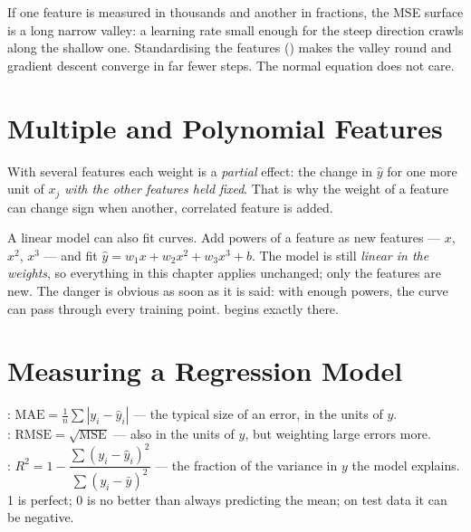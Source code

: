 \begin{alertbox}
If one feature is measured in thousands and another in fractions, the MSE surface
is a long narrow valley: a learning rate small enough for the steep direction
crawls along the shallow one. Standardising the features ()
makes the valley round and gradient descent converge in far fewer steps. The
normal equation does not care.
\end{alertbox}

\section{Multiple and Polynomial Features}

With several features each weight is a \emph{partial} effect: the change in
$\hat{y}$ for one more unit of $x_j$ \emph{with the other features held fixed}.
That is why the weight of a feature can change sign when another, correlated
feature is added.

A linear model can also fit curves. Add powers of a feature as new features ---
$x$, $x^2$, $x^3$ --- and fit
$\hat{y} = w_1 x + w_2 x^2 + w_3 x^3 + b$. The model is still \emph{linear in the
weights}, so everything in this chapter applies unchanged; only the features are
new. The danger is obvious as soon as it is said: with enough powers, the curve
can pass through every training point.  begins exactly there.

\section{Measuring a Regression Model}

\begin{definitionbox}
: $\text{MAE} = \frac{1}{n}\sum|y_i - \hat{y}_i|$ --- the
typical size of an error, in the units of $y$.\\[3pt]
: $\text{RMSE} = \sqrt{\text{MSE}}$ --- also in the
units of $y$, but weighting large errors more.\\[3pt]
:
$R^2 = 1 - \dfrac{\sum(y_i - \hat{y}_i)^2}{\sum(y_i - \bar{y})^2}$ --- the fraction
of the variance in $y$ the model explains. 1 is perfect; 0 is no better than
always predicting the mean; on test data it can be negative.
\end{definitionbox}

